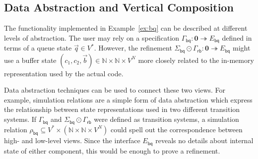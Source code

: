 \documentclass[acmsmall,screen,review,anonymous,nonacm]{acmart}
\newcommand{\kw}[1]{\ensuremath{ \mathsf{#1} }}
\newcommand{\emptysig}{\mathbf0}
\begin{document}




\subsection{Data Abstraction and Vertical Composition} \label{sec:sconv} %


The functionality implemented in Example~\ref{ex:bq}
can be described
at different levels of abstraction.
The user may rely on a specification
$\Gamma_\kw{bq} : \emptysig \twoheadrightarrow E_\kw{bq}$
defined in terms of a queue state $\vec{q} \in V^*$.
However,
the refinement
$\Sigma_\kw{bq} \odot \Gamma_\kw{rb} : \emptysig \twoheadrightarrow E_\kw{bq}$
might use a buffer state
$(c_1, c_2, \vec{b}) \in \mathbb{N} \times \mathbb{N} \times V^N$
more closely related to the
in-memory representation used by the actual code.

Data abstraction techniques
can be used to connect these two views.
For example, simulation relations are a simple form of data abstraction
which express the relationship between state representations used in
two different transition systems.
If $\Gamma_\kw{bq}$ and $\Sigma_\kw{bq} \odot \Gamma_\kw{rb}$
were defined as transition systems, a simulation relation
$\rho_\kw{bq} \subseteq V^* \times (\mathbb{N} \times \mathbb{N} \times V^N)$
could spell out the correspondence between
high- and low-level views.
Since the interface $E_\kw{bq}$ reveals no details about internal state
of either component,
this would be enough to prove a refinement.
\end{document}
